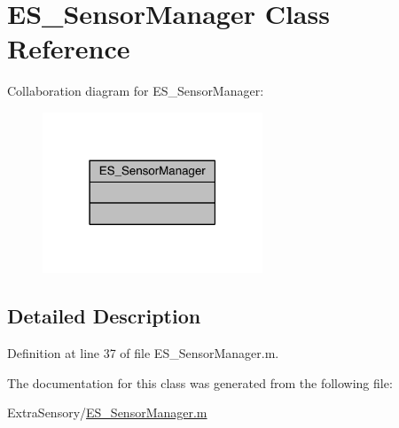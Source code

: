 \hypertarget{class_e_s___sensor_manager}{\section{E\+S\+\_\+\+Sensor\+Manager Class Reference}
\label{class_e_s___sensor_manager}
}


Collaboration diagram for E\+S\+\_\+\+Sensor\+Manager\+:\nopagebreak
\begin{figure}[H]
\begin{center}
\leavevmode
\includegraphics[width=186pt]{dd/db3/class_e_s___sensor_manager__coll__graph}
\end{center}
\end{figure}


\subsection{Detailed Description}


Definition at line 37 of file E\+S\+\_\+\+Sensor\+Manager.\+m.



The documentation for this class was generated from the following file\+:\begin{DoxyCompactItemize}
\item 
Extra\+Sensory/\hyperlink{_e_s___sensor_manager_8m}{E\+S\+\_\+\+Sensor\+Manager.\+m}\end{DoxyCompactItemize}
